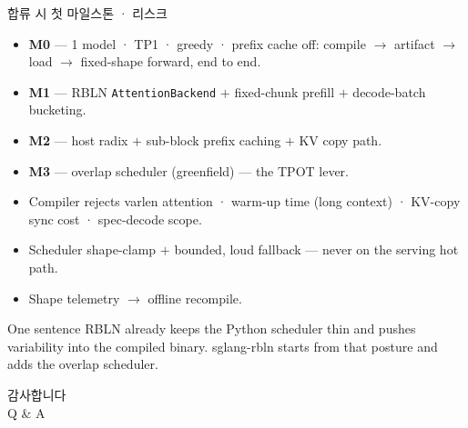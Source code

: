 \begin{frame}{합류 시 첫 마일스톤 · 리스크}
  \small
  \begin{itemize}
    \item \textbf{M0} — 1 model · TP1 · greedy · prefix cache off: compile $\to$ artifact $\to$ load $\to$ fixed-shape forward, end to end.
    \item \textbf{M1} — RBLN \texttt{AttentionBackend} $+$ fixed-chunk prefill $+$ decode-batch bucketing.
    \item \textbf{M2} — host radix $+$ sub-block prefix caching $+$ KV copy path.
    \item \textbf{M3} — overlap scheduler (greenfield) — the TPOT lever.
  \end{itemize}
  \begin{itemize}
    \item Compiler rejects varlen attention · warm-up time (long context) · KV-copy sync cost · spec-decode scope.
    \item Scheduler shape-clamp $+$ bounded, loud fallback — never on the serving hot path.
    \item Shape telemetry $\to$ offline recompile.
  \end{itemize}
  \begin{alertblock}{One sentence}
    RBLN already keeps the Python scheduler thin and pushes variability into the compiled binary.
    sglang-rbln starts from that posture and adds the overlap scheduler.
  \end{alertblock}
\end{frame}

\begin{frame}[standout]
  감사합니다 \\[0.4em] Q \& A
\end{frame}
